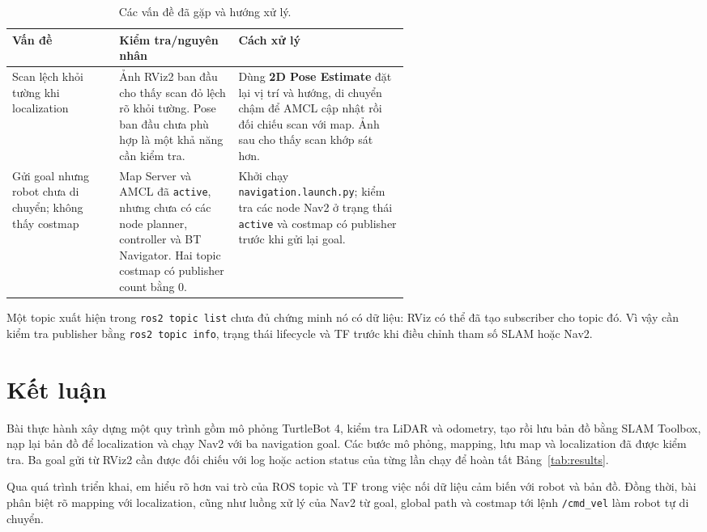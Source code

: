 \documentclass[12pt,a4paper]{article}
\begin{document}
\begin{table}[htbp]
  \centering
  \caption{Các vấn đề đã gặp và hướng xử lý.}
  \label{tab:issues}
  \small
  \renewcommand{\arraystretch}{1.17}
  \begin{tabularx}{\linewidth}{@{}p{0.27\linewidth}p{0.30\linewidth}X@{}}
    \toprule
    \textbf{Vấn đề} & \textbf{Kiểm tra/nguyên nhân} & \textbf{Cách xử lý} \\
    \midrule
    Scan lệch khỏi tường khi localization
      & Ảnh RViz2 ban đầu cho thấy scan đỏ lệch rõ khỏi tường. Pose ban đầu chưa phù hợp là một khả năng cần kiểm tra.
      & Dùng \textbf{2D Pose Estimate} đặt lại vị trí và hướng, di chuyển chậm để AMCL cập nhật rồi đối chiếu scan với map. Ảnh sau cho thấy scan khớp sát hơn. \\
    Gửi goal nhưng robot chưa di chuyển; không thấy costmap
      & Map Server và AMCL đã \texttt{active}, nhưng chưa có các node planner, controller và BT Navigator. Hai topic costmap có publisher count bằng 0.
      & Khởi chạy \texttt{navigation.launch.py}; kiểm tra các node Nav2 ở trạng thái \texttt{active} và costmap có publisher trước khi gửi lại goal. \\
    \bottomrule
  \end{tabularx}
\end{table}

Một topic xuất hiện trong \texttt{ros2 topic list} chưa đủ chứng minh nó có
dữ liệu: RViz có thể đã tạo subscriber cho topic đó. Vì vậy cần kiểm tra
publisher bằng \texttt{ros2 topic info}, trạng thái lifecycle và TF trước khi
điều chỉnh tham số SLAM hoặc Nav2.

\section{Kết luận}

Bài thực hành xây dựng một quy trình gồm mô phỏng TurtleBot 4, kiểm tra LiDAR và
odometry, tạo rồi lưu bản đồ bằng SLAM Toolbox, nạp lại bản đồ để localization
và chạy Nav2 với ba navigation goal. Các bước mô phỏng, mapping, lưu map và localization đã được kiểm tra.
Ba goal gửi từ RViz2 cần được đối chiếu với log hoặc action status của từng
lần chạy để hoàn tất Bảng~\ref{tab:results}.

Qua quá trình triển khai, em hiểu rõ hơn vai trò của ROS topic và TF trong việc nối
dữ liệu cảm biến với robot và bản đồ. Đồng thời, bài phân biệt rõ mapping với
localization, cũng như luồng xử lý của Nav2 từ goal, global path và costmap tới
lệnh \texttt{/cmd\_vel} làm robot tự di chuyển.
\end{document}
